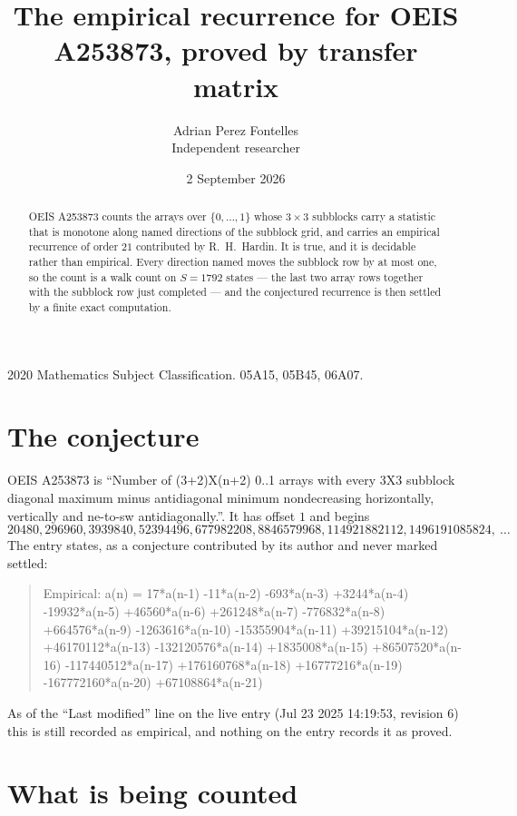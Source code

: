 \documentclass[11pt,a4paper]{article}
\title{The empirical recurrence for OEIS A253873, proved by transfer matrix}
\author{Adrian Perez Fontelles\\ \small Independent researcher}
\date{2 September 2026}
\theoremstyle{plain}
\theoremstyle{definition}
\begin{document}
\maketitle

\begin{abstract}
OEIS A253873 counts the arrays over $\{0,\dots,1\}$ whose $3\times3$ subblocks carry a
statistic that is monotone along named directions of the subblock grid, and carries an
empirical recurrence of order $21$ contributed by R.~H.~Hardin. It is true, and it is
decidable rather than empirical. Every direction named moves the subblock row by at most one,
so the count is a walk count on $S=1792$ states --- the last two array rows together with the
subblock row just completed --- and the conjectured recurrence is then settled by a finite
exact computation.
\end{abstract}

\noindent\small 2020 Mathematics Subject Classification. 05A15, 05B45, 06A07.\normalsize

\section{The conjecture}

OEIS A253873 is ``Number of (3+2)X(n+2) 0..1 arrays with every 3X3 subblock diagonal maximum minus antidiagonal minimum nondecreasing horizontally, vertically and ne-to-sw antidiagonally.''. It has offset $1$ and begins
\[
20480, 296960, 3939840, 52394496, 677982208, 8846579968, 114921882112, 1496191085824,\ \dots
\]
The entry states, as a conjecture contributed by its author and never marked settled:
\begin{quote}
Empirical: a(n) = 17*a(n-1) -11*a(n-2) -693*a(n-3) +3244*a(n-4) -19932*a(n-5) +46560*a(n-6) +261248*a(n-7) -776832*a(n-8) +664576*a(n-9) -1263616*a(n-10) -15355904*a(n-11) +39215104*a(n-12) +46170112*a(n-13) -132120576*a(n-14) +1835008*a(n-15) +86507520*a(n-16) -117440512*a(n-17) +176160768*a(n-18) +16777216*a(n-19) -167772160*a(n-20) +67108864*a(n-21)
\end{quote}
As of the ``Last modified'' line on the live entry (Jul 23 2025 14:19:53, revision 6) this is still
recorded as empirical, and nothing on the entry records it as proved.

\section{What is being counted}
\end{document}
